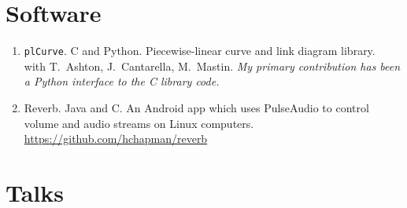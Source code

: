 \documentclass[letterpaper]{article}
\begin{document}
\section*{Software}

\begin{enumerate}
\item \texttt{plCurve}. C and Python. Piecewise-linear curve and link diagram library.\\
  with T.\ Ashton, J.\ Cantarella, M.\ Mastin.
  \textit{My primary contribution has been a Python interface to the C
  library code.}
\item Reverb. Java and C. An Android app which uses PulseAudio to
  control volume and audio streams on Linux computers. \\
  \url{https://github.com/hchapman/reverb}
\end{enumerate}

\section*{Talks}
\end{document}
